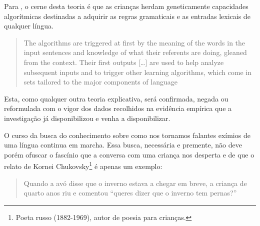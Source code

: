 \documentclass[output=paper]{LSP/langsci}
\begin{document}
Para \citet{pinker1984}, o cerne desta teoria é que as crianças herdam geneticamente capacidades algorítmicas destinadas a adquirir as regras gramaticais e as entradas lexicais de qualquer língua. 

\begin{quote}
The algorithms are triggered at first by the meaning of the words in the input sentences and knowledge of what their referents are doing, gleaned from the context. Their first outputs […] are used to help analyze subsequent inputs and to trigger other learning algorithms, which come in sets tailored to the major components of language \citep[xv]{pinker1984}
\end{quote}

Esta, como qualquer outra teoria explicativa, será confirmada, negada ou reformulada com o vigor dos dados recolhidos na evidência empírica que a investigação já disponibilizou e venha a disponibilizar.

O curso da busca do conhecimento sobre como nos tornamos falantes exímios de uma língua continua em marcha. Essa busca, necessária e premente, não deve porém ofuscar o fascínio que a conversa com uma criança nos desperta e de que o relato de Kornei Chukovsky\footnote{Poeta russo (1882-1969), autor de poesia para crianças.} é apenas um exemplo:

\begin{quote}
Quando a avó disse que o inverno estava a chegar em breve, a criança de quarto anos riu e comentou “queres dizer que o inverno tem pernas?'' \citeyearpar[tradução livre da versão inglesa de][11]{chukovsky1963}
\end{quote}

\newpage
{\sloppy
\printbibliography[heading=subbibliography,notkeyword=this]
}
\end{document}
